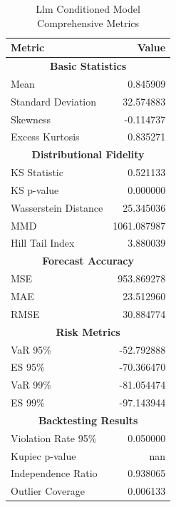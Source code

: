 \begin{table}[htbp]
\centering
\begin{tabular}{lr}
\hline
\textbf{Metric} & \textbf{Value} \\
\hline
\multicolumn{2}{c}{\textbf{Basic Statistics}} \\
\hline
Mean & 0.845909 \\
Standard Deviation & 32.574883 \\
Skewness & -0.114737 \\
Excess Kurtosis & 0.835271 \\
\hline
\multicolumn{2}{c}{\textbf{Distributional Fidelity}} \\
\hline
KS Statistic & 0.521133 \\
KS p-value & 0.000000 \\
Wasserstein Distance & 25.345036 \\
MMD & 1061.087987 \\
Hill Tail Index & 3.880039 \\
\hline
\multicolumn{2}{c}{\textbf{Forecast Accuracy}} \\
\hline
MSE & 953.869278 \\
MAE & 23.512960 \\
RMSE & 30.884774 \\
\hline
\multicolumn{2}{c}{\textbf{Risk Metrics}} \\
\hline
VaR 95\% & -52.792888 \\
ES 95\% & -70.366470 \\
VaR 99\% & -81.054474 \\
ES 99\% & -97.143944 \\
\hline
\multicolumn{2}{c}{\textbf{Backtesting Results}} \\
\hline
Violation Rate 95\% & 0.050000 \\
Kupiec p-value & nan \\
Independence Ratio & 0.938065 \\
Outlier Coverage & 0.006133 \\
\hline
\end{tabular}
\caption{Llm Conditioned Model Comprehensive Metrics}
\label{tab:llm_conditioned_comprehensive_metrics}
\end{table}
